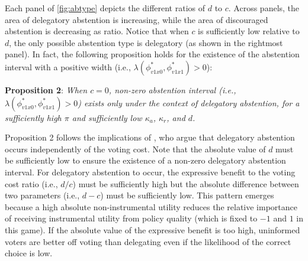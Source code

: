 \documentclass[letterpaper, 12pt]{article}
\begin{document}
    \par Each panel of \autoref{fig:abtype} depicts the different ratios of $d$ to $c$. Across panels, the area of delegatory abstention is increasing, while the area of discouraged abstention is decreasing as ratio. Notice that when $c$ is sufficiently low relative to $d$, the only possible abstention type is delegatory (as shown in the rightmost panel). In fact, the following proposition holds for the existence of the abstention interval with a positive width (i.e., $\lambda(\phi^*_{v1x0},\phi^*_{v1x1})>0$):
    
    \noindent \textbf{Proposition 2}: \textit{When $c=0$, non-zero abstention interval (i.e., $\lambda(\phi^*_{v1x0},\phi^*_{v1x1})>0$) exists only under the context of delegatory abstention, for a sufficiently high $\pi$ and sufficiently low $\kappa_a$, $\kappa_r$, and $d$.}
    
    \noindent Proposition 2 follows the implications of \cite{Feddersen1996thsw}, who argue that delegatory abstention occurs independently of the voting cost. Note that the absolute value of $d$ must be sufficiently low to ensure the existence of a non-zero delegatory abstention interval. For delegatory abstention to occur, the expressive benefit to the voting cost ratio (i.e., $d/c$) must be sufficiently high but the absolute difference between two parameters (i.e., $d-c$) must be sufficiently low. This pattern emerges because a high absolute non-instrumental utility reduces the relative importance of receiving instrumental utility from policy quality (which is fixed to $-1$ and $1$ in this game). If the absolute value of the expressive benefit is too high, uninformed voters are better off voting than delegating even if the likelihood of the correct choice is low.
    
\end{document}
